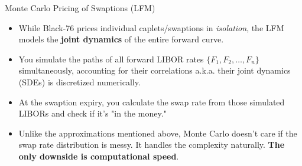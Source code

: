 \documentclass{beamer}
\begin{document}
\begin{frame}{Monte Carlo Pricing of Swaptions (LFM)}
	\begin{itemize}
		\item While Black-76 prices individual caplets/swaptions in \emph{isolation}, the LFM models the \textbf{joint dynamics} of the entire forward curve.
		\item You simulate the paths of all forward LIBOR rates $\{F_1, F_2, \ldots, F_n\}$ simultaneously, accounting for their correlations a.k.a.  their joint dynamics (SDEs) is discretized numerically.
		\item At the swaption expiry, you calculate the swap rate from those simulated LIBORs and check if it's "in the money."
		\item Unlike the approximations mentioned above, Monte Carlo doesn't care if the swap rate distribution is messy. It handles the complexity naturally. \textbf{The only downside is computational speed}.

	\end{itemize}
\end{frame}
\end{document}
